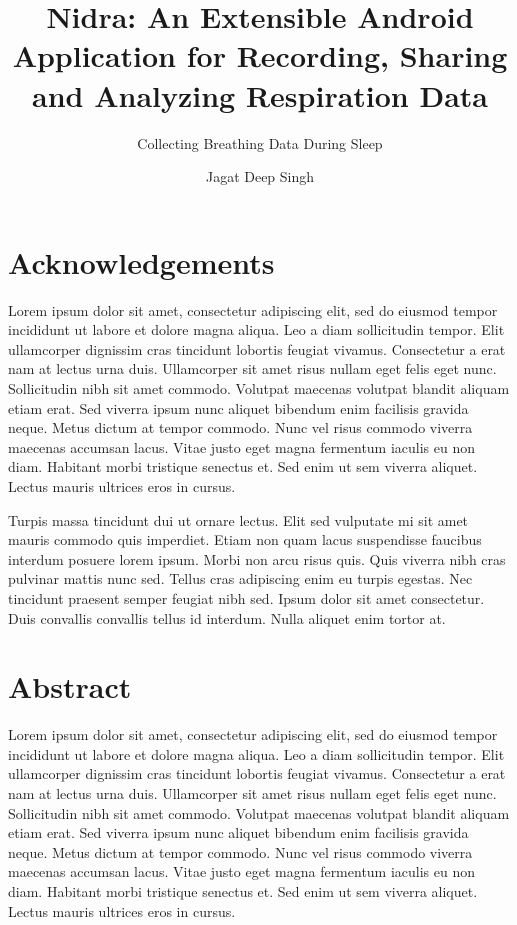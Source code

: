 \documentclass[UKenglish]{ifimaster}  %
\title{Nidra: An Extensible Android Application for Recording, Sharing and Analyzing Respiration Data}
\subtitle{Collecting Breathing Data During Sleep}
\author{Jagat Deep Singh}
\begin{document}
\duoforside[dept={Department of Informatics},   %
  program={Programming and Networks},  %
  long]                                        %

\frontmatter{}
\chapter*{Acknowledgements}
    Lorem ipsum dolor sit amet, consectetur adipiscing elit, sed do eiusmod tempor incididunt ut labore et dolore magna aliqua. Leo a diam sollicitudin tempor. Elit ullamcorper dignissim cras tincidunt lobortis feugiat vivamus. Consectetur a erat nam at lectus urna duis. Ullamcorper sit amet risus nullam eget felis eget nunc. Sollicitudin nibh sit amet commodo. Volutpat maecenas volutpat blandit aliquam etiam erat. Sed viverra ipsum nunc aliquet bibendum enim facilisis gravida neque. Metus dictum at tempor commodo. Nunc vel risus commodo viverra maecenas accumsan lacus. Vitae justo eget magna fermentum iaculis eu non diam. Habitant morbi tristique senectus et. Sed enim ut sem viverra aliquet. Lectus mauris ultrices eros in cursus.

    Turpis massa tincidunt dui ut ornare lectus. Elit sed vulputate mi sit amet mauris commodo quis imperdiet. Etiam non quam lacus suspendisse faucibus interdum posuere lorem ipsum. Morbi non arcu risus quis. Quis viverra nibh cras pulvinar mattis nunc sed. Tellus cras adipiscing enim eu turpis egestas. Nec tincidunt praesent semper feugiat nibh sed. Ipsum dolor sit amet consectetur. Duis convallis convallis tellus id interdum. Nulla aliquet enim tortor at.

\chapter*{Abstract}
    Lorem ipsum dolor sit amet, consectetur adipiscing elit, sed do eiusmod tempor incididunt ut labore et dolore magna aliqua. Leo a diam sollicitudin tempor. Elit ullamcorper dignissim cras tincidunt lobortis feugiat vivamus. Consectetur a erat nam at lectus urna duis. Ullamcorper sit amet risus nullam eget felis eget nunc. Sollicitudin nibh sit amet commodo. Volutpat maecenas volutpat blandit aliquam etiam erat. Sed viverra ipsum nunc aliquet bibendum enim facilisis gravida neque. Metus dictum at tempor commodo. Nunc vel risus commodo viverra maecenas accumsan lacus. Vitae justo eget magna fermentum iaculis eu non diam. Habitant morbi tristique senectus et. Sed enim ut sem viverra aliquet. Lectus mauris ultrices eros in cursus.
\end{document}
